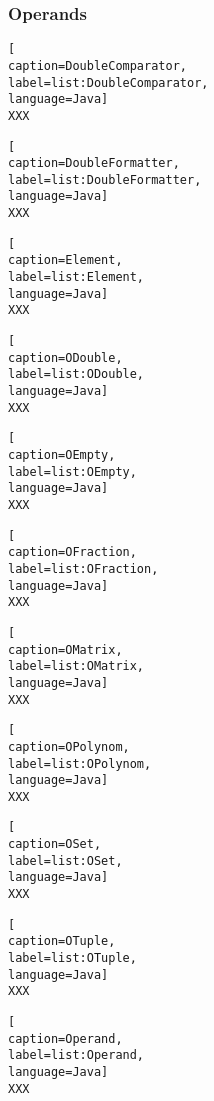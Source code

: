 \subsubsection{Operands}

\begin{lstlisting}[
caption=DoubleComparator,
label=list:DoubleComparator,
language=Java]
XXX
\end{lstlisting}    

\begin{lstlisting}[
caption=DoubleFormatter,
label=list:DoubleFormatter,
language=Java]
XXX
\end{lstlisting} 

\begin{lstlisting}[
caption=Element,
label=list:Element,
language=Java]
XXX
\end{lstlisting}    

\begin{lstlisting}[
caption=ODouble,
label=list:ODouble,
language=Java]
XXX
\end{lstlisting}    

\begin{lstlisting}[
caption=OEmpty,
label=list:OEmpty,
language=Java]
XXX
\end{lstlisting}    

\begin{lstlisting}[
caption=OFraction,
label=list:OFraction,
language=Java]
XXX
\end{lstlisting}    

\begin{lstlisting}[
caption=OMatrix,
label=list:OMatrix,
language=Java]
XXX
\end{lstlisting}    

\begin{lstlisting}[
caption=OPolynom,
label=list:OPolynom,
language=Java]
XXX
\end{lstlisting}    

\begin{lstlisting}[
caption=OSet,
label=list:OSet,
language=Java]
XXX
\end{lstlisting}    

\begin{lstlisting}[
caption=OTuple,
label=list:OTuple,
language=Java]
XXX
\end{lstlisting}    

\begin{lstlisting}[
caption=Operand,
label=list:Operand,
language=Java]
XXX
\end{lstlisting}    

